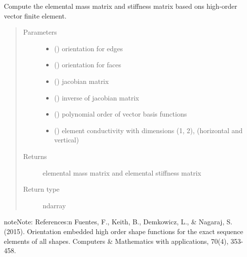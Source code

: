 \documentclass[letterpaper,10pt,english]{sphinxmanual}
\begin{document}
\begin{fulllineitems}
\label{\detokenize{petgem/hvfem:petgem.hvfem.computeElementalMatrices}}
Compute the elemental mass matrix and stiffness matrix based ons high-order vector finite element.
\begin{quote}\begin{description}
\item[{Parameters}] \leavevmode\begin{itemize}
\item {} 
 () \textendash{} orientation for edges

\item {} 
 () \textendash{} orientation for faces

\item {} 
 () \textendash{} jacobian matrix

\item {} 
 () \textendash{} inverse of jacobian matrix

\item {} 
 () \textendash{} polynomial order of vector basis functions

\item {} 
 () \textendash{} element conductivity with dimensions (1, 2), (horizontal and vertical)

\end{itemize}

\item[{Returns}] \leavevmode
elemental mass matrix and elemental stiffness matrix

\item[{Return type}] \leavevmode
ndarray

\end{description}\end{quote}

\begin{sphinxadmonition}{note}{Note:}
References:n
Fuentes, F., Keith, B., Demkowicz, L., \& Nagaraj, S. (2015). Orientation
embedded high order shape functions for the exact sequence elements of
all shapes. Computers \& Mathematics with applications, 70(4), 353-458.
\end{sphinxadmonition}

\end{fulllineitems}
\end{document}
